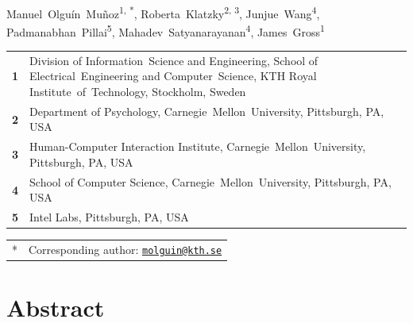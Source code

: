 \documentclass[10pt,letterpaper]{article}
\begin{document}
\vspace*{0.2in}

\begin{flushleft}
{\Large
\textbf{} %
}
\newline
\\
Manuel~{Olguín~Muñoz}\textsuperscript{1, *},
Roberta~Klatzky\textsuperscript{2, 3},
Junjue~Wang\textsuperscript{4},
Padmanabhan~Pillai\textsuperscript{5},
Mahadev~Satyanarayanan\textsuperscript{4},
James~Gross\textsuperscript{1}
\\
\bigskip
\begin{tabularx}{\textwidth}{lX}
  \textbf{1} & Division of Information~Science and Engineering, School of Electrical~Engineering and Computer~Science, KTH Royal Institute~of~Technology, Stockholm, Sweden\\
  \textbf{2} & Department of Psychology, Carnegie~Mellon~University, Pittsburgh, PA, USA\\
  \textbf{3} & Human-Computer Interaction Institute, Carnegie~Mellon~University, Pittsburgh, PA, USA\\
  \textbf{4} & School of Computer Science, Carnegie~Mellon~University, Pittsburgh, PA, USA\\
  \textbf{5} & Intel Labs, Pittsburgh, PA, USA\\
\end{tabularx}
\bigskip

\begin{tabularx}{\textwidth}{lX}
  * & Corresponding author: \href{mailto:molguin@kth.se}{\texttt{molguin@kth.se}}\\
\end{tabularx}

\end{flushleft}

\section*{Abstract}
\end{document}

